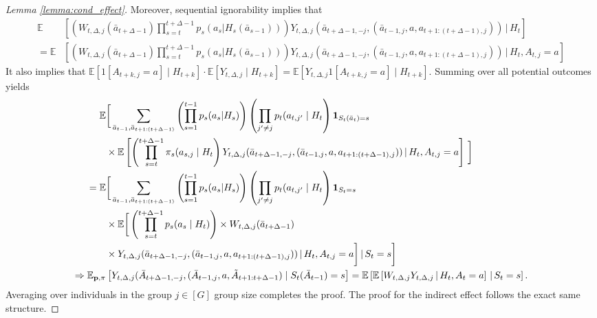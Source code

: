 \documentclass[supplementary, lineno]{biometrika}
\def\E{\mathbb{E}}
\def\given{\, | \,}
\begin{document}
\begin{proof}[Lemma \ref{lemma:cond_effect}]
Moreover, sequential ignorability implies that
\begin{align*}
 \E &\left[ \left( W_{t,\Delta, j} (\bar a_{t+\Delta-1}) \prod_{s=t}^{t+\Delta-1} p_s(a_s |H_s(\bar a_{s-1})) \right) Y_{t,\Delta,j} (\bar{a}_{t+\Delta-1,-j}, (\bar a_{t-1,j},a, a_{t+1:(t+\Delta-1),j})) \given H_t \right]  \\
 = \E &\left[ \left( W_{t,\Delta, j} (\bar a_{t+\Delta-1}) \prod_{s=t}^{t+\Delta-1} p_s(a_s |H_s(\bar a_{s-1})) \right) Y_{t,\Delta,j} (\bar{a}_{t+\Delta-1,-j}, (\bar a_{t-1,j},a, a_{t+1:(t+\Delta-1),j})) \given H_{t}, A_{t,j} = a \right]
\end{align*}
It also implies that $\E \left[ 1[A_{t+k,j} = a] \mid H_{t+k} \right] \cdot \E \left[ Y_{t,\Delta,j} \mid H_{t+k} \right] = \E \left[ Y_{t,\Delta,j} 1[A_{t+k,j} = a] \mid H_{t+k} \right]$.
Summing over all potential outcomes yields
\begin{align*}
\E &\bigg [ \sum_{\bar{a}_{t-1}, \bar a_{t+1:(t+\Delta-1)}} \left(\prod_{s=1}^{t-1} p_s(a_s|H_s) \right) \left( \prod_{j^\prime \neq j} p_t(a_{t,j^\prime} \mid H_t \right)  {\bf 1}_{S_t(\bar a_t) = s} \\
&\times \E \left[ \left( \prod_{s=t}^{t+\Delta-1} \pi_s(a_{s,j} \mid H_t \right) Y_{t,\Delta,j} (\bar{a}_{t+\Delta-1,-j}, (\bar a_{t-1,j},a, a_{t+1:(t+\Delta-1),j})) \given H_t, A_{t,j} = a \right] \, \bigg] \\
 = \E &\bigg [ \sum_{\bar{a}_{t-1}, \bar a_{t+1:(t+\Delta-1)}} \left(\prod_{s=1}^{t-1} p_s(a_s|H_s) \right) \left( \prod_{j^\prime \neq j} p_t(a_{t,j^\prime} \mid H_t \right)  {\bf 1}_{S_t = s} \\
 &\times
 \E \bigg[ \left( \prod_{s=t}^{t+\Delta-1} p_s(a_{s} \mid H_t) \right) \times W_{t,\Delta,j} (\bar a_{t+\Delta-1}) \\ 
 &\times Y_{t,\Delta,j} (\bar{a}_{t+\Delta-1,-j}, (\bar a_{t-1,j},a, a_{t+1:(t+\Delta-1),j})) \given H_t, A_{t,j} = a \bigg]
 \given S_t = s \bigg] \\ 
 \Rightarrow
 \E_{{\bf p}, \pi} &\left[ Y_{t,\Delta,j} (\bar A_{t+\Delta-1, -j}, (\bar A_{t-1,j}, a, \tilde A_{t+1:t+\Delta-1}) \mid S_t (\bar A_{t-1}) = s \right] =
 \E \left[ \E \left[ W_{t,\Delta,j} Y_{t,\Delta,j}  \given H_t, A_t = a \right] \given S_t = s \right].
\end{align*}
Averaging over individuals in the group $j \in [G]$ group size completes the proof.
The proof for the indirect effect follows the exact same structure.
\end{proof}
\end{document}
